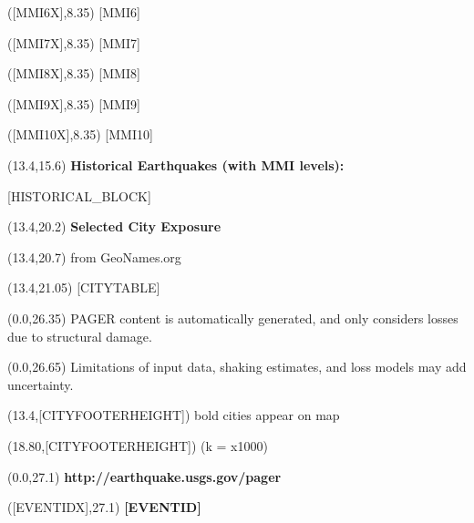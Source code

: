 \documentclass[6pt]{article}
\begin{document}
\begin{textblock}{1.5}([MMI6X],8.35)
  [MMI6]
\end{textblock}

\begin{textblock}{1.5}([MMI7X],8.35)
  [MMI7]
\end{textblock}

\begin{textblock}{1.5}([MMI8X],8.35)
  [MMI8]
\end{textblock}

\begin{textblock}{1.5}([MMI9X],8.35)
  [MMI9]
\end{textblock}

\begin{textblock}{1.5}([MMI10X],8.35)
  [MMI10]
\end{textblock}

\begin{textblock}{7.5}(13.4,15.6)
\textbf{Historical Earthquakes (with MMI levels):}
\end{textblock}

[HISTORICAL_BLOCK]

\begin{textblock}{7.5}(13.4,20.2)
\fontsize{14}{16.8}\textbf{Selected City Exposure}
\end{textblock}

\begin{textblock}{7.5}(13.4,20.7)
{\footnotesize from GeoNames.org}
\end{textblock}


\begin{textblock}{7.8}(13.4,21.05)
[CITYTABLE]
\end{textblock}

\begin{textblock}{13.0}(0.0,26.35)
{\footnotesize PAGER content is automatically generated, and only considers losses due
to structural damage.}
\end{textblock}

\begin{textblock}{12.0}(0.0,26.65)
{\footnotesize Limitations of input data, shaking estimates, and loss models 
may add uncertainty.}
\end{textblock}

\begin{textblock}{7.5}(13.4,[CITYFOOTERHEIGHT])
{\footnotesize bold cities appear on map}
\end{textblock}

\begin{textblock}{7.5}(18.80,[CITYFOOTERHEIGHT])
{\footnotesize (k = x1000)}
\end{textblock}

\begin{textblock}{7.5}(0.0,27.1)
{\footnotesize \textbf{http://earthquake.usgs.gov/pager}}
\end{textblock}

\begin{textblock}{7.5}([EVENTIDX],27.1)
\textbf{[EVENTID]}
\end{textblock}
\end{document}
